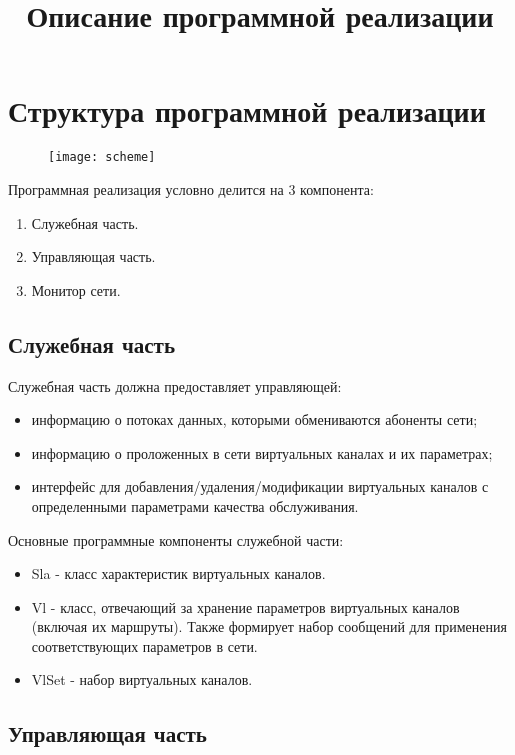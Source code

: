 \documentclass[12pt]{article}
\title{Описание программной реализации}
\author{}
\date{}
\begin{document}
\maketitle
\sloppy

	\section{Структура программной реализации}
	\begin{figure}[ht]
		\centering
		\texttt{[image: scheme]}
	\end{figure}

	\noindent
	Программная реализация условно делится на 3 компонента:
	\begin{enumerate}
		\item Служебная часть.
		\item Управляющая часть.
		\item Монитор сети.
	\end{enumerate}


	\subsection{Служебная часть}
	
	Служебная часть должна предоставляет управляющей:
	\begin{itemize}
		\item информацию о потоках данных, которыми обмениваются абоненты сети;
		\item информацию о проложенных в сети виртуальных каналах и их параметрах;
		\item интерфейс для добавления/удаления/модификации виртуальных каналов с определенными параметрами качества обслуживания.
	\end{itemize}

	\noindent
	Основные программные компоненты служебной части:
	\begin{itemize}
		\item Sla - класс характеристик виртуальных каналов.
		\item Vl - класс, отвечающий за хранение параметров виртуальных каналов (включая их маршруты). Также формирует набор сообщений для применения соответствующих параметров в сети.
		\item VlSet - набор виртуальных каналов.
	\end{itemize}
	
	
	\subsection{Управляющая часть}
	
\end{document}
